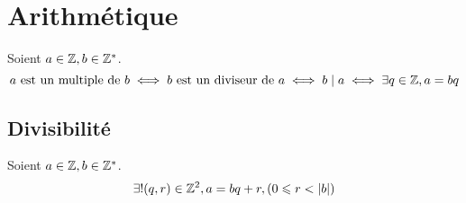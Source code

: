 \chapter{Arithmétique}
\begin{definition}
    Soient $a \in \mathbb{Z}, b \in \mathbb{Z}^*$.
    \[ a \text{ est un multiple de } b \iff b \text{ est un diviseur de } a \iff b \mid a \iff \exists q \in \mathbb{Z}, a = bq \]
\end{definition}

\section{Divisibilité}

\begin{theorem}
    Soient $a \in \mathbb{Z}, b \in \mathbb{Z}^*$.
    \[ \exists ! (q, r) \in \mathbb{Z}^2, a = bq + r, (0 \leqslant r < \abs{b}) \]
\end{theorem}


